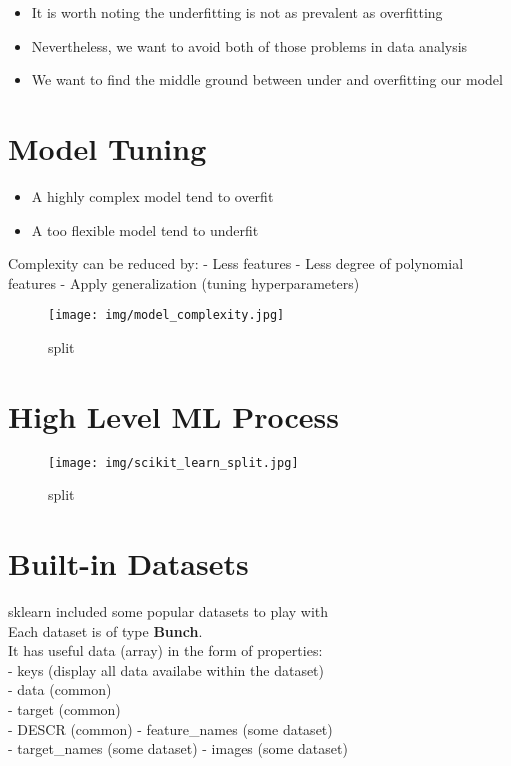 \documentclass[
]{book}
\providecommand{\tightlist}{%
  \setlength{\itemsep}{0pt}\setlength{\parskip}{0pt}}
\begin{document}
\begin{itemize}
\tightlist
\item
  It is worth noting the underfitting is not as prevalent as overfitting
\item
  Nevertheless, we want to avoid both of those problems in data analysis
\item
  We want to find the middle ground between under and overfitting our model
\end{itemize}

\hypertarget{model-tuning}{%
\section{Model Tuning}\label{model-tuning}}

\begin{itemize}
\tightlist
\item
  A highly complex model tend to overfit
\item
  A too flexible model tend to underfit
\end{itemize}

Complexity can be reduced by: - Less features - Less degree of polynomial features - Apply generalization (tuning hyperparameters)

\begin{figure}
\centering
\texttt{[image: img/model\_complexity.jpg]}
\caption{split}
\end{figure}

\hypertarget{high-level-ml-process}{%
\section{High Level ML Process}\label{high-level-ml-process}}

\begin{figure}
\centering
\texttt{[image: img/scikit\_learn\_split.jpg]}
\caption{split}
\end{figure}

\hypertarget{built-in-datasets}{%
\section{Built-in Datasets}\label{built-in-datasets}}

sklearn included some popular datasets to play with\\
Each dataset is of type \textbf{Bunch}.\\
It has useful data (array) in the form of properties:\\
- keys (display all data availabe within the dataset)\\
- data (common)\\
- target (common)\\
- DESCR (common) - feature\_names (some dataset)\\
- target\_names (some dataset) - images (some dataset)
\end{document}
